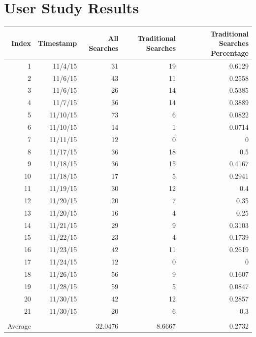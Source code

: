 \documentclass{uofsthesis-cs}
\begin{document}
\uofsappendix

\chapter{User Study Results}

\begin{table}[htbp]
  \centering
    \begin{tabular}{rrrrr}
    \toprule
    Index & Timestamp & All Searches & Traditional Searches & Traditional Searches Percentage \\
    \midrule
    1     & 11/4/15 & 31    & 19    & 0.6129 \\
    2     & 11/6/15 & 43    & 11    & 0.2558 \\
    3     & 11/6/15 & 26    & 14    & 0.5385 \\
    4     & 11/7/15 & 36    & 14    & 0.3889 \\
    5     & 11/10/15 & 73    & 6     & 0.0822 \\
    6     & 11/10/15 & 14    & 1     & 0.0714 \\
    7     & 11/11/15 & 12    & 0     & 0 \\
    8     & 11/17/15 & 36    & 18    & 0.5 \\
    9     & 11/18/15 & 36    & 15    & 0.4167 \\
    10    & 11/18/15 & 17    & 5     & 0.2941 \\
    11    & 11/19/15 & 30    & 12    & 0.4 \\
    12    & 11/20/15 & 20    & 7     & 0.35 \\
    13    & 11/20/15 & 16    & 4     & 0.25 \\
    14    & 11/21/15 & 29    & 9     & 0.3103 \\
    15    & 11/22/15 & 23    & 4     & 0.1739 \\
    16    & 11/23/15 & 42    & 11    & 0.2619 \\
    17    & 11/24/15 & 12    & 0     & 0 \\
    18    & 11/26/15 & 56    & 9     & 0.1607 \\
    19    & 11/28/15 & 59    & 5     & 0.0847 \\
    20    & 11/30/15 & 42    & 12    & 0.2857 \\
    21    & 11/30/15 & 20    & 6     & 0.3 \\
          &       &       &       &  \\
    Average &       & 32.0476 & 8.6667 & 0.2732 \\
    \bottomrule
    \end{tabular}%
  \label{tab:addlabel}%
\end{table}%
\end{document}
